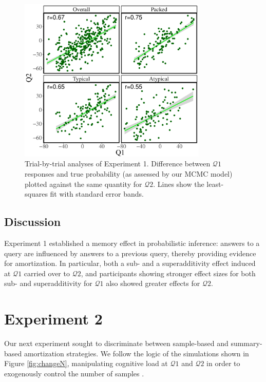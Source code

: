 \begin{figure}
\centering
\includegraphics[width=0.8\textwidth]{figures/exp1correspondence.pdf}
\caption{Trial-by-trial analyses of Experiment 1. Difference between $\mathcal{Q}1$ responses and true probability (as assessed by our MCMC model) plotted against the same quantity for $\mathcal{Q}2$. Lines show the least-squares fit with standard error bands.}
\label{fig:correspondence1}
\end{figure}

\subsection{Discussion}

Experiment 1 established a memory effect in probabilistic inference: answers to a query are influenced by answers to a previous query, thereby providing evidence for amortization. In particular, both a sub- and a superadditivity effect induced at $\mathcal{Q}1$ carried over to $\mathcal{Q}2$, and participants showing stronger effect sizes for both sub- and superadditivity for $\mathcal{Q}1$ also showed greater effects for $\mathcal{Q}2$. 

\section{Experiment 2}

Our next experiment sought to discriminate between sample-based and summary-based amortization strategies. We follow the logic of the simulations shown in Figure \ref{fig:changeN}, manipulating cognitive load at $\mathcal{Q}1$ and $\mathcal{Q}2$ in order to exogenously control the number of samples \citep[see][for a similar approach]{thaker17,dasgupta17}. 

